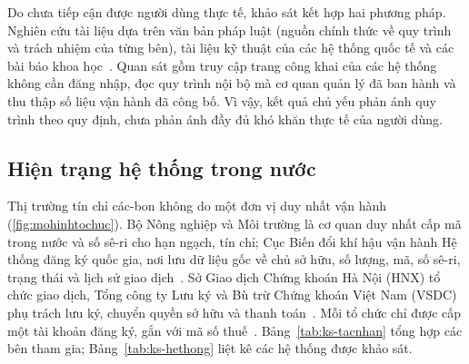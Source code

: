 Do chưa tiếp cận được người dùng thực tế, khảo sát kết hợp hai phương pháp. Nghiên cứu tài liệu dựa trên văn bản pháp luật (nguồn chính thức về quy trình và trách nhiệm của từng bên), tài liệu kỹ thuật của các hệ thống quốc tế và các bài báo khoa học~\cite{kim2020blockchain,sipthorpe2022blockchain,vaccargiu2026blockchain}. Quan sát gồm truy cập trang công khai của các hệ thống không cần đăng nhập, đọc quy trình nội bộ mà cơ quan quản lý đã ban hành và thu thập số liệu vận hành đã công bố. Vì vậy, kết quả chủ yếu phản ánh quy trình theo quy định, chưa phản ánh đầy đủ khó khăn thực tế của người dùng.

\FloatBarrier
\subsection*{Hiện trạng hệ thống trong nước}
\label{subsec:ks-tongquan}
\label{subsec:ks-hientrang}

Thị trường tín chỉ các-bon không do một đơn vị duy nhất vận hành (\autoref{fig:mohinhtochuc}). Bộ Nông nghiệp và Môi trường là cơ quan duy nhất cấp mã trong nước và số sê-ri cho hạn ngạch, tín chỉ; Cục Biến đổi khí hậu vận hành Hệ thống đăng ký quốc gia, nơi lưu dữ liệu gốc về chủ sở hữu, số lượng, mã, số sê-ri, trạng thái và lịch sử giao dịch~\cite{vietnam2026thongtu11}. Sở Giao dịch Chứng khoán Hà Nội (HNX) tổ chức giao dịch, Tổng công ty Lưu ký và Bù trừ Chứng khoán Việt Nam (VSDC) phụ trách lưu ký, chuyển quyền sở hữu và thanh toán~\cite{vietnam2026nghidinh29}. Mỗi tổ chức chỉ được cấp một tài khoản đăng ký, gắn với mã số thuế~\cite{vietnam2026thongtu11}. Bảng~\ref{tab:ks-tacnhan} tổng hợp các bên tham gia; Bảng~\ref{tab:ks-hethong} liệt kê các hệ thống được khảo sát.

\HinhMoHinhToChuc

